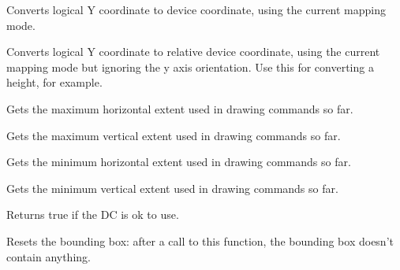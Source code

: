 \label{wxdclogicaltodevicey}


Converts logical Y coordinate to device coordinate, using the current
mapping mode.


\label{wxdclogicaltodeviceyrel}


Converts logical Y coordinate to relative device coordinate, using the current
mapping mode but ignoring the y axis orientation.
Use this for converting a height, for example.


\label{wxdcmaxx}


Gets the maximum horizontal extent used in drawing commands so far.


\label{wxdcmaxy}


Gets the maximum vertical extent used in drawing commands so far.


\label{wxdcminx}


Gets the minimum horizontal extent used in drawing commands so far.


\label{wxdcminy}


Gets the minimum vertical extent used in drawing commands so far.


\label{wxdcok}


Returns true if the DC is ok to use.


\label{wxdcresetboundingbox}


Resets the bounding box: after a call to this function, the bounding box
doesn't contain anything.




\label{wxdcsetaxisorientation}

